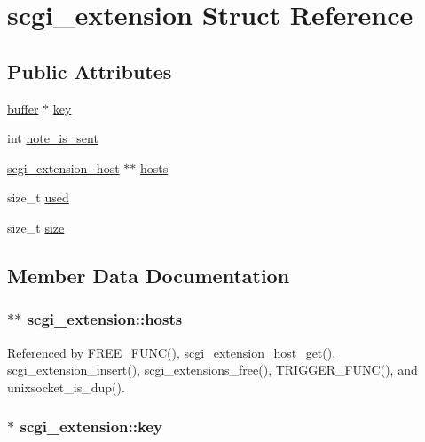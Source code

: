 \hypertarget{structscgi__extension}{\section{scgi\-\_\-extension Struct Reference}
\label{structscgi__extension}
}
\subsection*{Public Attributes}
\begin{DoxyCompactItemize}
\item 
\hyperlink{structbuffer}{buffer} $\ast$ \hyperlink{structscgi__extension_af9b965d0f11fe15a3418af505ed8e5cd}{key}
\item 
int \hyperlink{structscgi__extension_ab74093f209555f27c49043442eaa2b12}{note\-\_\-is\-\_\-sent}
\item 
\hyperlink{structscgi__extension__host}{scgi\-\_\-extension\-\_\-host} $\ast$$\ast$ \hyperlink{structscgi__extension_abd10f0016549ae516a4f05ca7c4ce734}{hosts}
\item 
size\-\_\-t \hyperlink{structscgi__extension_a2c364e431d07495a4c5105916bf4ef94}{used}
\item 
size\-\_\-t \hyperlink{structscgi__extension_a1c964b877584c51c1e758c2ba21ab080}{size}
\end{DoxyCompactItemize}


\subsection{Member Data Documentation}
\hypertarget{structscgi__extension_abd10f0016549ae516a4f05ca7c4ce734}{
\subsubsection[{hosts}]{$\ast$$\ast$ scgi\-\_\-extension\-::hosts}}\label{structscgi__extension_abd10f0016549ae516a4f05ca7c4ce734}


Referenced by F\-R\-E\-E\-\_\-\-F\-U\-N\-C(), scgi\-\_\-extension\-\_\-host\-\_\-get(), scgi\-\_\-extension\-\_\-insert(), scgi\-\_\-extensions\-\_\-free(), T\-R\-I\-G\-G\-E\-R\-\_\-\-F\-U\-N\-C(), and unixsocket\-\_\-is\-\_\-dup().

\hypertarget{structscgi__extension_af9b965d0f11fe15a3418af505ed8e5cd}{
\subsubsection[{key}]{$\ast$ scgi\-\_\-extension\-::key}}\label{structscgi__extension_af9b965d0f11fe15a3418af505ed8e5cd}


